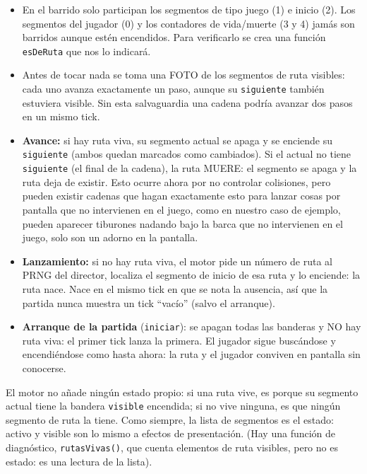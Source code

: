 	\begin{itemize}
		\item En el barrido solo participan los segmentos de tipo juego (1) e
		inicio (2). Los segmentos del jugador (0) y los
		contadores de vida/muerte (3 y 4) jamás son barridos aunque estén
		encendidos. Para verificarlo se crea una función \texttt{esDeRuta} que nos lo indicará.
		
		\item Antes de tocar nada se toma una FOTO de los
		segmentos de ruta visibles: cada uno avanza exactamente un paso,
		aunque su \texttt{siguiente} también estuviera visible. Sin esta salvaguardia una cadena podría avanzar dos pasos en un mismo tick.
		
		\item \textbf{Avance:} si hay ruta viva, su segmento actual se
		apaga y se enciende su \texttt{siguiente} (ambos quedan
		marcados como cambiados). Si el actual no tiene
		\texttt{siguiente} (el final de la cadena), la ruta MUERE:
		el segmento se apaga y la ruta deja de existir. Esto ocurre ahora por no controlar colisiones, pero pueden existir cadenas que hagan exactamente esto para lanzar cosas por pantalla que no intervienen en el juego, como en nuestro caso de ejemplo, pueden aparecer tiburones nadando bajo la barca que no intervienen en el juego, solo son un adorno en la pantalla.
		
		\item \textbf{Lanzamiento:} si no hay ruta viva, el motor pide un
		número de ruta al PRNG del director, localiza el segmento de
		inicio de esa ruta y lo enciende: la ruta nace. Nace en el
		mismo tick en que se nota la ausencia, así que la partida
		nunca muestra un tick ``vacío'' (salvo el arranque).
		
		\item \textbf{Arranque de la partida} (\texttt{iniciar}): se
		apagan todas las banderas y NO hay ruta viva: el primer
		tick lanza la primera. El jugador sigue buscándose y
		encendiéndose como hasta ahora: la ruta y el
		jugador conviven en pantalla sin conocerse.
	\end{itemize}
	
	El motor no añade ningún estado propio: si una ruta vive, es porque
	su segmento actual tiene la bandera \texttt{visible} encendida; si
	no vive ninguna, es que ningún segmento de ruta la tiene. Como
	siempre, la lista de segmentos es el estado: activo y visible son
	lo mismo a efectos de presentación. (Hay una función de diagnóstico,
	\texttt{rutasVivas()}, que cuenta elementos de ruta visibles, pero
	no es estado: es una lectura de la lista).
	
